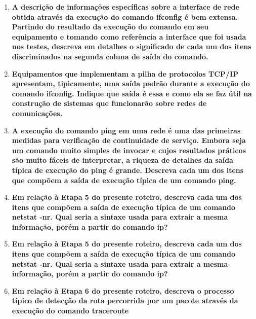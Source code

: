\begin{enumerate}
  \item \textbf{A descrição de informações específicas sobre a interface de rede obtida através da execução
    do comando ifconfig é bem extensa. Partindo do resultado da execução do comando em seu
    equipamento e tomando como referência a interface que foi usada nos testes, descreva em
    detalhes o significado de cada um dos itens discriminados na segunda coluna de saída do
    comando.}

  \item \textbf{Equipamentos que implementam a pilha de protocolos TCP/IP apresentam, tipicamente, uma
    saída padrão durante a execução do comando ifconfig. Indique que saída é essa e como ela
    se faz útil na construção de sistemas que funcionarão sobre redes de comunicações.}

  \item \textbf{A execução do comando ping em uma rede é uma das primeiras medidas para verificação de
    continuidade de serviço. Embora seja um comando muito simples de invocar e cujos
    resultados práticos são muito fáceis de interpretar, a riqueza de detalhes da saída típica de
    execução do ping é grande. Descreva cada um dos itens que compõem a saída de execução
    típica de um comando ping.}

  \item \textbf{Em relação à Etapa 5 do presente roteiro, descreva cada um dos itens que compõem a saída
    de execução típica de um comando netstat -nr. Qual seria a sintaxe usada para extrair a
    mesma informação, porém a partir do comando ip?}

  \item \textbf{Em relação à Etapa 5 do presente roteiro, descreva cada um dos itens que compõem a saída
    de execução típica de um comando netstat -nr. Qual seria a sintaxe usada para extrair a
    mesma informação, porém a partir do comando ip?}

  \item \textbf{Em relação à Etapa 6 do presente roteiro, descreva o processo típico de detecção da rota
    percorrida por um pacote através da execução do comando traceroute}

\end{enumerate}
